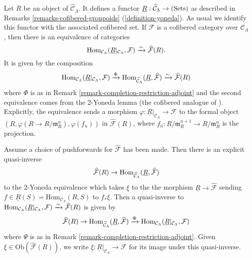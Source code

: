 \begin{remark}
\label{remark-formal-objects-yoneda}
Let $R$ be an object of $\widehat{\mathcal C}_{\Lambda}$.  It defines a functor 
$\underline{R}: \widehat{\mathcal C}_{\Lambda} \rightarrow \textnormal{(Sets)}$ 
as described in Remarks \ref{remarks-cofibered-groupoids} 
(\ref{definition-yoneda}). As usual we identify this functor with the 
associated cofibered set.  If $\mathcal F$ is a cofibered category over 
$\mathcal C_{\Lambda}$, then there is an equivalence of categories
\[
\textnormal{Hom}_{\mathcal C_{\Lambda}}(\underline{R}|_{\mathcal C_{\Lambda}}, 
\mathcal F) 
\xrightarrow{\sim} 
\widehat{\mathcal F}(R).
\]
It is given by the composition
\[
\textnormal{Hom}_{\mathcal C_{\Lambda}}(\underline{R}|_{\mathcal C_{\Lambda}}, 
\mathcal F) 
\xrightarrow{\Phi} 
\textnormal{Hom}_{\widehat{\mathcal C}_{\Lambda}}(\underline{R}, 
\widehat{\mathcal F}) 
\xrightarrow{\sim}
\widehat{\mathcal F}(R)
\]
where $\Phi$ is as in Remark \ref{remark-completion-restriction-adjoint} and 
the second equivalence comes from the 2-Yoneda lemma (the cofibered analogue of 
\cite[Section 4.38]{stacks-project}).  Explicitly, the equivalence sends a 
morphism $\varphi: \underline{R}|_{\mathcal C_{\Lambda}} \rightarrow \mathcal 
F$ to the formal object $(R, \varphi(R \rightarrow R/\mathfrak{m}_R^n), 
\varphi(f_n))$ in $\widehat{\mathcal F}(R)$, where $f_{n}: 
R/\mathfrak{m}_R^{n+1} \rightarrow R/\mathfrak{m}_{R}^{n}$ is the projection.  

\medskip \noindent
Assume a choice of pushforwards for $\widehat{\mathcal F}$ has been made.  Then 
there is an explicit quasi-inverse
\[ \widehat{\mathcal F}(R) \rightarrow \textnormal{Hom}_{\widehat{\mathcal 
C}_{\Lambda}}(\underline{R}, \widehat{\mathcal F}) \]
to the 2-Yoneda equivalence which takes $\xi$ to the the morphism 
$\underline{R} \rightarrow \widehat{\mathcal F}$ sending $f \in 
\underline{R}(S) = \text{Hom}_{\mathcal C_{\Lambda}}(R,S)$ to $f_* \xi$.  Then 
a quasi-inverse to $\textnormal{Hom}_{\mathcal 
C_{\Lambda}}(\underline{R}|_{\mathcal C_{\Lambda}}, \mathcal F) 
\xrightarrow{\sim} 
\widehat{\mathcal F}(R)$ is given by
\[
\widehat{\mathcal F}(R) 
\rightarrow 
\textnormal{Hom}_{\widehat{\mathcal C}_{\Lambda}}(\underline{R}, 
\widehat{\mathcal F})
\xrightarrow{\Psi}
\textnormal{Hom}_{\mathcal C_{\Lambda}}(\underline{R}|_{\mathcal C_{\Lambda}}, 
\mathcal F)
\]
where $\Psi$ is as in Remark \ref{remark-completion-restriction-adjoint}.  
Given $\xi \in \text{Ob}(\widehat{\mathcal F}(R))$, we write $\underline{\xi}: 
\underline{R}|_{\mathcal C_{\Lambda}} \rightarrow \mathcal F$ for its image 
under this quasi-inverse.
\end{remark}

